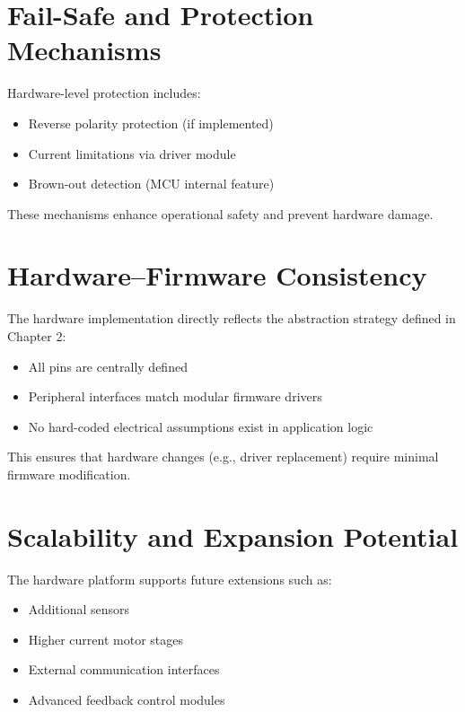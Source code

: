 \section{Fail-Safe and Protection Mechanisms}

Hardware-level protection includes:

\begin{itemize}
	\item Reverse polarity protection (if implemented)
	\item Current limitations via driver module
	\item Brown-out detection (MCU internal feature)
\end{itemize}

These mechanisms enhance operational safety and prevent hardware damage.


\section{Hardware–Firmware Consistency}

The hardware implementation directly reflects the abstraction strategy defined in Chapter 2:

\begin{itemize}
	\item All pins are centrally defined
	\item Peripheral interfaces match modular firmware drivers
	\item No hard-coded electrical assumptions exist in application logic
\end{itemize}

This ensures that hardware changes (e.g., driver replacement) require minimal firmware modification.


\section{Scalability and Expansion Potential}

The hardware platform supports future extensions such as:

\begin{itemize}
	\item Additional sensors
	\item Higher current motor stages
	\item External communication interfaces
	\item Advanced feedback control modules
\end{itemize}

